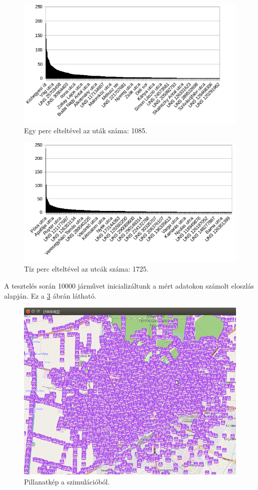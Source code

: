 \documentclass[a4paper,12pt]{report}
\begin{document}
\begin{figure}[h]
\centerline{
\includegraphics[scale=.8]{img/a2}}
\caption{Egy perc elteltével az uták száma: 1085.}
\label{histb}
\end{figure}

\begin{figure}[h]
\centerline{
\includegraphics[scale=.8]{img/a3}}
\caption{Tíz perc elteltével az utcák száma: 1725.}
\label{histc}
\end{figure}

A tesztelés során 10000 járművet inicializáltunk a mért adatokon számolt eloszlás alapján. Ez a \ref{simultenth} ábrán látható.

\begin{figure}[h]
\centerline{
\includegraphics[scale=.5]{img/a33}}
\caption{Pillanatkép a szimulációból.}
\label{simultenth}
\end{figure}
\end{document}
